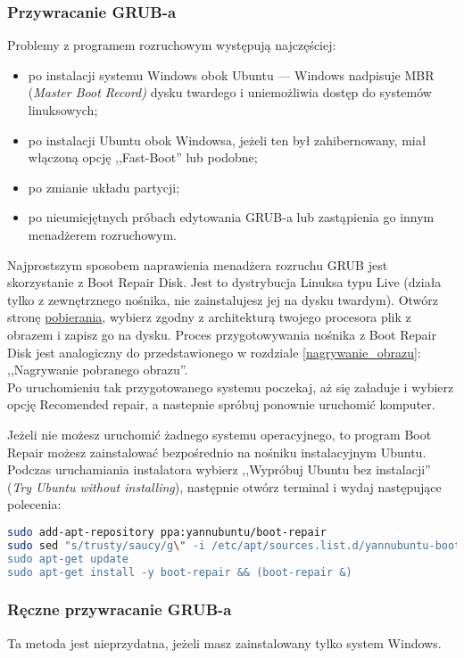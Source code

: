 \subsubsection{Przywracanie GRUB-a}
\label{grub_przywracanie}
Problemy z programem rozruchowym występują najczęściej:
\begin{itemize}
\item po instalacji systemu Windows obok Ubuntu --- Windows nadpisuje MBR (\textit{Master Boot Record)} dysku twardego i uniemożliwia dostęp do systemów linuksowych;
\item po instalacji Ubuntu obok Windowsa, jeżeli ten był zahibernowany, miał włączoną opcję ,,Fast-Boot'' lub podobne;
\item po zmianie układu partycji;
\item po nieumiejętnych próbach edytowania GRUB-a lub zastąpienia go innym menadżerem rozruchowym.
\end{itemize}

Najprostszym sposobem naprawienia menadżera rozruchu GRUB jest skorzystanie z Boot Repair Disk. Jest to dystrybucja Linuksa typu Live (działa tylko z zewnętrznego nośnika, nie zainstalujesz jej na dysku twardym). Otwórz stronę \href{http://sourceforge.net/projects/boot-repair-cd/files/}{pobierania}, wybierz zgodny z architekturą twojego procesora plik z obrazem i zapisz go na dysku. Proces przygotowywania nośnika z Boot Repair Disk jest analogiczny do przedstawionego w rozdziale \ref{nagrywanie_obrazu}: ,,Nagrywanie pobranego obrazu''.\\
Po uruchomieniu tak przygotowanego systemu poczekaj, aż się załaduje i wybierz opcję \textcolor{ubuntu_orange}{Recomended repair}, a nastepnie spróbuj ponownie uruchomić komputer.

Jeżeli nie możesz uruchomić żadnego systemu operacyjnego, to program Boot Repair możesz zainstalować bezpośrednio na nośniku instalacyjnym Ubuntu. Podczas uruchamiania instalatora wybierz ,,Wypróbuj Ubuntu bez instalacji'' (\textit{Try Ubuntu without installing}), następnie otwórz terminal  i wydaj następujące polecenia:

\begin{lstlisting}[language=bash]
sudo add-apt-repository ppa:yannubuntu/boot-repair
sudo sed "s/trusty/saucy/g\" -i /etc/apt/sources.list.d/yannubuntu-boot-repair-trusty.list
sudo apt-get update
sudo apt-get install -y boot-repair && (boot-repair &)
\end{lstlisting}

\subsubsection{Ręczne przywracanie GRUB-a}
Ta metoda jest nieprzydatna, jeżeli masz zainstalowany tylko system Windows.

